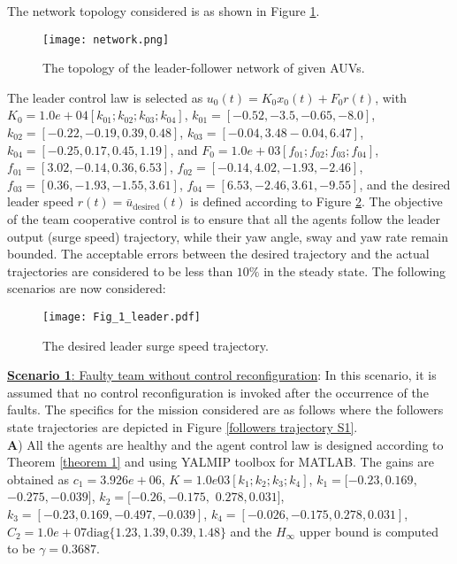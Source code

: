 \documentclass[12pt,draftcls,onecolumn]{IEEEtran}
\begin{document}
 \par
  The network topology  considered is as shown in Figure \ref{network}.  
        \begin{figure}[thpb]
      \centering
        \texttt{[image: network.png]}
      \caption{The topology of the leader-follower network of given AUVs.}     
      \label{network}
   \end{figure}  
   The leader control law is selected as $u_0(t)=K_0x_0(t)+F_0r(t)$, with  $K_0=1.0e+04 [k_{01};k_{02};k_{03};k_{04}]$,  
    $k_{01}=[ -0.52,   -3.5,   -0.65,   -8.0]$,  
   $k_{02}=[-0.22,-0.19,0.39,0.48]$, 
   $k_{03}=[-0.04,3.48 -0.04, 6.47]$, 
   $k_{04}=[-0.25,0.17,0.45,1.19]$, and $F_0= 1.0e+03 [f_{01};f_{02};f_{03};f_{04}]$, 
    $f_{01}=[3.02,-0.14,0.36,6.53]$, 
   $f_{02}=[-0.14,4.02,-1.93,-2.46]$, 
    $f_{03}=[0.36,-1.93,-1.55,3.61]$, 
    $f_{04}=[6.53,-2.46,3.61,-9.55]$, and the desired leader  speed $r(t)=\bar u_{\text{desired}}(t)$ is  defined according to Figure \ref{leader trajectory}. The objective of the team cooperative control is to ensure that all the agents follow the leader output (surge speed) trajectory, while their yaw angle,  sway and yaw rate remain bounded. The acceptable errors  between the desired trajectory and the actual trajectories are considered to be less than $10\%$ in the steady state. The following scenarios are now considered:\\
      \begin{figure}[thpb]
      \centering
        \texttt{[image: Fig\_1\_leader.pdf]}
      \caption{The desired leader surge speed trajectory.}     
      \label{leader trajectory}
   \end{figure}  
 \underline{  \textbf{Scenario 1}: Faulty team without control reconfiguration}: In this scenario, it is assumed that no control reconfiguration is invoked after the occurrence of the faults. The specifics for the mission considered are  as follows where the followers state trajectories are depicted in Figure \ref{followers trajectory S1}.\\
\textbf{A}) All the agents are healthy and the agent control law is designed according to Theorem \ref{theorem 1} and using YALMIP toolbox \cite{Yalmip} for MATLAB. The gains are obtained as $c_1=3.926e+06$, 
$K=1.0e03[k_1;k_2;k_3;k_4]$, 
$k_1=[-0.23,0.169 ,$ $-0.275,-0.039]$, 
  $k_2=[ -0.26,-0.175,$ $0.278,0.031]$,  
  $k_3=[ -0.23,0.169,-0.497,-0.039]$, 
   $k_4=[-0.026,-0.175 ,0.278,0.031]$,
     $C_2=1.0e+07\text{diag}\{1.23,1.39,0.39,1.48\}$ and  the $H_{\infty}$  upper bound is computed to be  $\gamma=0.3687$.
\end{document}
